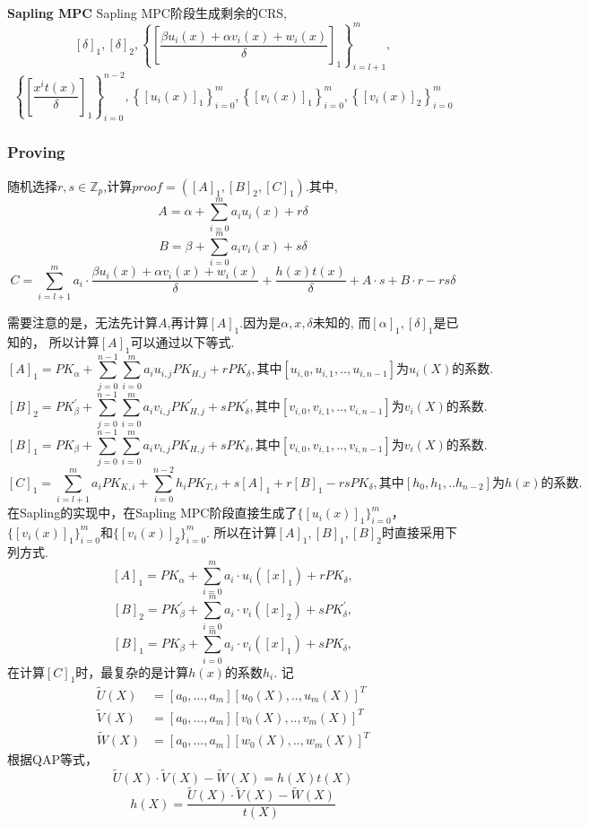 \documentclass{article}
\begin{document}
\textbf{Sapling MPC}
Sapling MPC阶段生成剩余的CRS,
$$
[\delta]_1,[\delta]_2, 
\left\{\left[\frac{\beta u_i(x)+\alpha v_i(x)+w_i(x)}{\delta}\right]_1\right\}_{i=l+1}^m,
$$
$$
\left\{\left[\frac{x^it(x)}{\delta}\right]_1\right\}_{i=0}^{n-2},
\left\{[u_i(x)]_1\right\}_{i=0}^m, \left\{[v_i(x)]_1\right\}_{i=0}^m,\left\{[v_i(x)]_2\right\}_{i=0}^m
$$

\subsubsection{Proving}
随机选择$r,s\in \mathbb{Z}_p$,计算$proof=([A]_1,[B]_2,[C]_1)$.其中,\\
$$
A=\alpha +\sum_{i=0}^m{a_iu_i(x)+r\delta}
$$
$$
B=\beta +\sum_{i=0}^m{a_iv_i(x)+s\delta}
$$
$$
C=\sum_{i=l+1}^{m}{a_i\cdot \frac{\beta u_i(x)+\alpha v_i(x)+w_i(x)}{\delta}} + \frac{h(x)t(x)}{\delta}
+ A\cdot s + B\cdot r - rs\delta
$$

需要注意的是，无法先计算$A$,再计算$[A]_1$.因为是$\alpha,x,\delta$未知的, 而$[\alpha]_1,[\delta]_1$是已知的，
所以计算$[A]_1$可以通过以下等式.
$$
[A]_1=P K_{\alpha}+\sum_{j=0}^{n-1} \sum_{i=0}^{m} a_{i} u_{i, j} PK_{H, j}+r P K_{\delta}, 
\text{其中} [u_{i,0},u_{i,1},..,u_{i,n-1}] \text{为} u_i(X) \text{的系数}.
$$
$$
[B]_2=P K_{\beta}^{\prime}+\sum_{j=0}^{n-1} \sum_{i=0}^{m} a_{i} v_{i, j} PK_{H, j}^{\prime}+s P K_{\delta}^{\prime},
\text{其中} [v_{i,0},v_{i,1},..,v_{i,n-1}] \text{为} v_i(X) \text{的系数}.
$$
$$
[B]_1=P K_{\beta}+\sum_{j=0}^{n-1} \sum_{i=0}^{m} a_{i} v_{i, j} PK_{H, j}+s PK_{\delta},
\text{其中} [v_{i,0},v_{i,1},..,v_{i,n-1}] \text{为} v_i(X) \text{的系数}.
$$
$$
[C]_1 =\sum_{i=l+1}^{m}a_{i} PK_{K,i}+\sum_{i=0}^{n-2}h_{i}PK_{T,i}+s[A]_1+r[B]_1-rsPK_{\delta},
\text{其中}[h_0,h_1,..h_{n-2}]\text{为}h(x)\text{的系数}.
$$
在Sapling的实现中，在Sapling MPC阶段直接生成了$\{[u_i(x)]_1\}_{i=0}^m$，$\{[v_i(x)]_1\}_{i=0}^m$和$\{[v_i(x)]_2\}_{i=0}^m$.
所以在计算$[A]_1,[B]_1,[B]_2$时直接采用下列方式.
$$
[A]_1=P K_{\alpha}+\sum_{i=0}^{m} a_{i}\cdot u_i([x]_1)+r P K_{\delta}, 
$$
$$
[B]_2=P K_{\beta}^{\prime}+\sum_{i=0}^{m} a_{i}\cdot v_i([x]_2)+s P K_{\delta}^{\prime},
$$
$$
[B]_1=P K_{\beta}+\sum_{i=0}^{m} a_{i}\cdot v_i([x]_1)+s PK_{\delta},
$$
在计算$[C]_1$时，最复杂的是计算$h(x)\text{的系数}h_i$.
记
\begin{displaymath}
    \begin{array}{ll}
        \tilde{U}(X) &= [a_0,...,a_m] [u_0(X),..,u_m(X)]^T \\
        \tilde{V}(X) &= [a_0,...,a_m] [v_0(X),..,v_m(X)]^T \\
        \tilde{W}(X) &= [a_0,...,a_m] [w_0(X),..,w_m(X)]^T
    \end{array}
    \end{displaymath}
根据QAP等式，
$$\tilde{U}(X) \cdot  \tilde{V}(X) - \tilde{W}(X) = h(X)t(X)$$
$$h(X) = \frac{\tilde{U}(X) \cdot  \tilde{V}(X) - \tilde{W}(X)}{t(X)}$$
\end{document}
